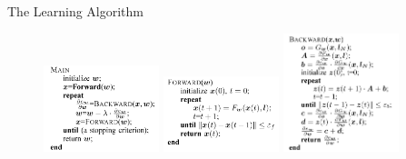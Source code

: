 \documentclass[10pt,aspectratio=169]{beamer}
\begin{document}
\begin{frame}[allowframebreaks]{The Learning Algorithm}
    \framebreak
    \begin{figure}
        \centering
        \includegraphics[width=0.3\textwidth]{pic/main.png}
        \includegraphics[width=0.3\textwidth]{pic/forward.png}
        \includegraphics[width=0.3\textwidth]{pic/backward.png}
    \end{figure}

\end{frame}
\end{document}
